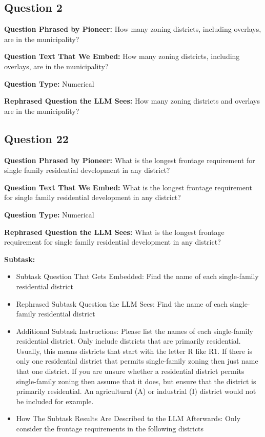 \vspace{1cm}
\subsection*{Question 2}
\noindent\textbf{Question Phrased by Pioneer:} How many zoning districts, including overlays, are in the municipality?

\noindent\textbf{Question Text That We Embed:} How many zoning districts, including overlays, are in the municipality?

\noindent\textbf{Question Type:} Numerical

\noindent\textbf{Rephrased Question the LLM Sees:} How many zoning districts and overlays are in the municipality?

\vspace{1cm}
\subsection*{Question 22}
\noindent\textbf{Question Phrased by Pioneer:} What is the longest frontage requirement for single family residential development in any district?

\noindent\textbf{Question Text That We Embed:} What is the longest frontage requirement for single family residential development in any district?

\noindent\textbf{Question Type:} Numerical

\noindent\textbf{Rephrased Question the LLM Sees:} What is the longest frontage requirement for single family residential development in any district?

\noindent\textbf{Subtask:}
\begin{itemize}
\item Subtask Question That Gets Embedded: Find the name of each single-family residential district
\item Rephrased Subtask Question the LLM Sees: Find the name of each single-family residential district
\item Additional Subtask Instructions: Please list the names of each single-family residential district. Only include districts that are primarily residential. Usually, this means districts that start with the letter R like R1. If there is only one residential district that permits single-family zoning then just name that one district. If you are unsure whether a residential district permits single-family zoning then assume that it does, but ensure that the district is primarily residential. An agricultural (A) or industrial (I) district would not be included for example. 
\item How The Subtask Results Are Described to the LLM Afterwards: Only consider the frontage requirements in the following districts
\end{itemize}


